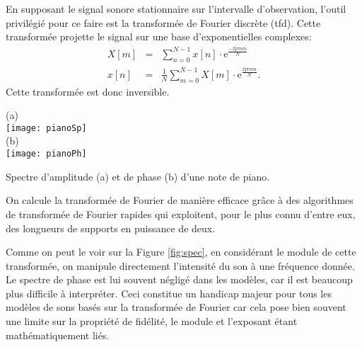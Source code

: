 En supposant le signal sonore stationnaire sur l'intervalle d'observation, l'outil privilégié pour ce faire est la transformée de Fourier discrète (tfd). Cette transformée projette le signal sur une base d'exponentielles complexes:
\begin{eqnarray}
  X[m] &=& \sum_{n=0}^{N-1} x[n] \cdot \mathrm{e}^{\frac{-2 \mathrm{j} \pi nm}{N}} \\
  x[n] &=& \frac{1}{N} \sum_{m=0}^{N-1} X[m] \cdot \mathrm{e}^{\frac{ 2 \mathrm{j} \pi m n }{N}}.
\end{eqnarray}
Cette transformée est donc inversible.%

\begin{marginfigure}
  \begin{center}
  \footnotesize
  (a) \\
  \texttt{[image: pianoSp]} \\
  (b) \\
  \texttt{[image: pianoPh]}
\end{center}
  \caption{Spectre d'amplitude (a) et de phase (b) d'une note de piano.}
  \label{fig:spec}
\end{marginfigure}

On calcule la transformée de Fourier de manière efficace grâce à des algorithmes de transformée de Fourier rapides qui exploitent, pour le plus connu d'entre eux, des longueurs de supports en puissance de deux.~\cite{cooley1965algorithm}



Comme on peut le voir sur la Figure \ref{fig:spec}, en considérant le module de cette transformée, on manipule directement l'intensité du son à une fréquence donnée. Le spectre de phase est lui souvent négligé dans les modèles, car il est beaucoup plus difficile à interpréter. Ceci constitue un handicap majeur pour tous les modèles de sons basés sur la transformée de Fourier car cela pose bien souvent une limite sur la propriété de fidélité, le module et l'exposant étant mathématiquement liés.



